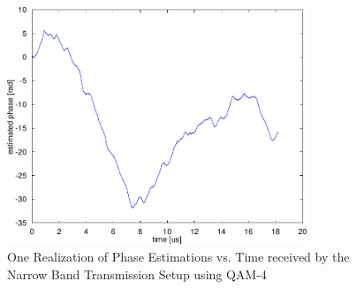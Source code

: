 \begin{figure}[p]
  \centering
  \includegraphics[width=0.8\textwidth]{figures/matlab/res_450_qam4_phase_est}
  \caption{One Realization of Phase Estimations vs. Time
    received by the Narrow Band Transmission Setup using \gls{QAM}-4}
  \label{fig:res_450_qam4_phase_est}
\end{figure}

